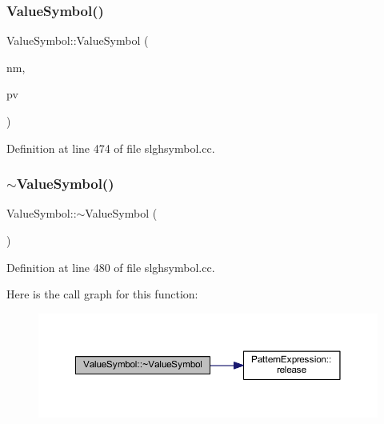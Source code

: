 \subsubsection{\texorpdfstring{ValueSymbol()}{ValueSymbol()}\hspace{0.1cm}{\footnotesize\ttfamily [2/2]}}
{\footnotesize\ttfamily Value\+Symbol\+::\+Value\+Symbol (\begin{DoxyParamCaption}\item[{const string \&}]{nm,  }\item[{\mbox{\hyperlink{class_pattern_value}{Pattern\+Value}} $\ast$}]{pv }\end{DoxyParamCaption})}



Definition at line 474 of file slghsymbol.\+cc.

\mbox{\label{class_value_symbol_afd7f520755d6be30812f5df293d527f4}} 
\subsubsection{\texorpdfstring{$\sim$ValueSymbol()}{~ValueSymbol()}}
{\footnotesize\ttfamily Value\+Symbol\+::$\sim$\+Value\+Symbol (\begin{DoxyParamCaption}\item[{void}]{ }\end{DoxyParamCaption})\hspace{0.3cm}{\ttfamily [virtual]}}



Definition at line 480 of file slghsymbol.\+cc.

Here is the call graph for this function\+:
\nopagebreak
\begin{figure}[H]
\begin{center}
\leavevmode
\includegraphics[width=350pt]{class_value_symbol_afd7f520755d6be30812f5df293d527f4_cgraph}
\end{center}
\end{figure}


